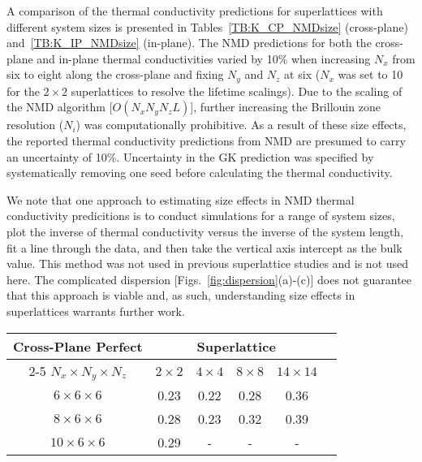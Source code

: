 \documentclass[aps,prb,preprint,preprintnumbers,amsmath,amssymb,floatfix,superscriptaddress]{revtex4}
\begin{document}
A comparison of the thermal conductivity predictions for superlattices with different system sizes is presented in Tables~\ref{TB:K_CP_NMDsize} (cross-plane) and~\ref{TB:K_IP_NMDsize} (in-plane). The NMD predictions for both the cross-plane and in-plane thermal conductivities varied by 10\% when increasing $N_x$ from six to eight along the cross-plane and fixing $N_y$ and $N_z$ at six ($N_x$ was set to 10 for the $2\times2$ superlattices to resolve the lifetime scalings). %
Due to the scaling of the NMD algorithm [$O(N_xN_yN_z L)$], further increasing the Brillouin zone resolution ($N_i$) was computationally prohibitive. As a result of these size effects, the reported thermal conductivity predictions from NMD are presumed to carry an uncertainty of 10\%. Uncertainty in the GK prediction was specified by systematically removing one seed before calculating the thermal conductivity.

We note that one approach to estimating size effects in NMD thermal conductivity predicitions is to conduct simulations for a range of system sizes, plot the inverse of thermal conductivity versus the inverse of the system length, fit a line through the data, and then take the vertical axis intercept as the bulk value.\cite{PhysRevB.81.214305}  %
This method was not used in previous superlattice studies \cite{doi:10.1021/nl202186y,savic:073113,Luckyanova16112012} and is not used here. The complicated dispersion [Figs.~\ref{fig:dispersion}(a)-(c)] does not guarantee that this approach is viable and, as such, understanding size effects in superlattices warrants further work.

\begin{table*}[h!]
\begin{center}
\begin{tabular*}{\textwidth}{c@{\extracolsep{\fill}}ccccc}
\hline\hline\noalign{\smallskip}
Cross-Plane Perfect& \multicolumn{4}{c}{Superlattice} \\
\cline{2-5}\noalign{\smallskip}
$N_x\times N_y \times N_z$ & $2\times2$ & $4\times4$ & $8\times8$ & $14\times14$  \\
\noalign{\smallskip}\hline\noalign{\smallskip}
$6\times6\times6$ & 0.23  & 0.22  &  0.28  &  0.36 \\
$8\times6\times6$ & 0.28  & 0.23  &  0.32  &  0.39 \\
$10\times6\times6$ & 0.29  &  - &  -  &  - \\
\hline\hline
\end{tabular*}
\end{center}
\renewcommand{\table}{Table.}
\caption{Size-dependent cross-plane NMD predictions thermal conductivity [W/m-K].}
\label{TB:K_CP_NMDsize}
\end{table*}
\end{document}
